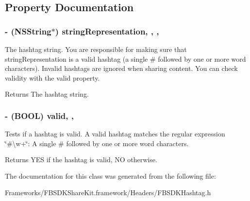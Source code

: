 \subsection{Property Documentation}
\hypertarget{interface_f_b_s_d_k_hashtag_aea104147de1efdc3eb12928736b615f4}{}
\subsubsection[{string\+Representation}]{\setlength{\rightskip}{0pt plus 5cm}-\/ (N\+S\+String$\ast$) string\+Representation\hspace{0.3cm}{\ttfamily [read]}, {\ttfamily [write]}, {\ttfamily [nonatomic]}, {\ttfamily [copy]}}\label{interface_f_b_s_d_k_hashtag_aea104147de1efdc3eb12928736b615f4}
The hashtag string.  You are responsible for making sure that {\ttfamily string\+Representation} is a valid hashtag (a single \textquotesingle{}\#\textquotesingle{} followed by one or more word characters). Invalid hashtags are ignored when sharing content. You can check validity with the {\ttfamily valid} property. \begin{DoxyReturn}{Returns}
The hashtag string. 
\end{DoxyReturn}
\hypertarget{interface_f_b_s_d_k_hashtag_a861ca020354206959069ee7fad096259}{}
\subsubsection[{valid}]{\setlength{\rightskip}{0pt plus 5cm}-\/ (B\+O\+O\+L) valid\hspace{0.3cm}{\ttfamily [read]}, {\ttfamily [nonatomic]}, {\ttfamily [assign]}}\label{interface_f_b_s_d_k_hashtag_a861ca020354206959069ee7fad096259}
Tests if a hashtag is valid.  A valid hashtag matches the regular expression \char`\"{}\#\textbackslash{}w+\char`\"{}\+: A single \textquotesingle{}\#\textquotesingle{} followed by one or more word characters. \begin{DoxyReturn}{Returns}
Y\+E\+S if the hashtag is valid, N\+O otherwise. 
\end{DoxyReturn}


The documentation for this class was generated from the following file\+:\begin{DoxyCompactItemize}
\item 
Frameworks/\+F\+B\+S\+D\+K\+Share\+Kit.\+framework/\+Headers/F\+B\+S\+D\+K\+Hashtag.\+h\end{DoxyCompactItemize}
